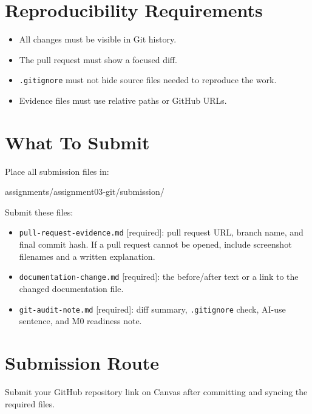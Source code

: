\documentclass[
  letterpaper,
  DIV=11,
  numbers=noendperiod,
  oneside]{scrreprt}
\newenvironment{Shaded}{\begin{snugshade}}{\end{snugshade}}
\newcommand{\NormalTok}[1]{\textcolor[rgb]{0.00,0.23,0.31}{#1}}
\providecommand{\tightlist}{%
  \setlength{\itemsep}{0pt}\setlength{\parskip}{0pt}}
\begin{document}
\section{Reproducibility
Requirements}\label{reproducibility-requirements-2}

\begin{itemize}
\tightlist
\item
  All changes must be visible in Git history.
\item
  The pull request must show a focused diff.
\item
  \texttt{.gitignore} must not hide source files needed to reproduce the
  work.
\item
  Evidence files must use relative paths or GitHub URLs.
\end{itemize}

\section{What To Submit}\label{what-to-submit-2}

Place all submission files in:

\begin{Shaded}
\begin{Highlighting}[numbers=left,,]
\NormalTok{assignments/assignment03{-}git/submission/}
\end{Highlighting}
\end{Shaded}

Submit these files:

\begin{itemize}
\tightlist
\item
  \texttt{pull-request-evidence.md} {[}required{]}: pull request URL,
  branch name, and final commit hash. If a pull request cannot be
  opened, include screenshot filenames and a written explanation.
\item
  \texttt{documentation-change.md} {[}required{]}: the before/after text
  or a link to the changed documentation file.
\item
  \texttt{git-audit-note.md} {[}required{]}: diff summary,
  \texttt{.gitignore} check, AI-use sentence, and M0 readiness note.
\end{itemize}

\section{Submission Route}\label{submission-route-2}

Submit your GitHub repository link on Canvas after committing and
syncing the required files.
\end{document}
